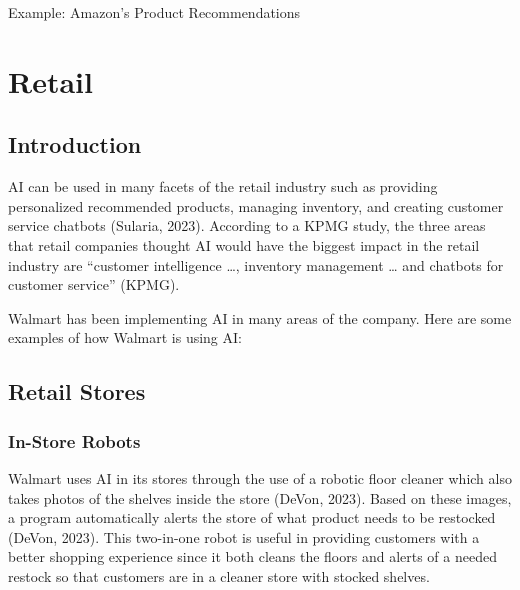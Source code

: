 \documentclass[
]{article}
\begin{document}
Example: Amazon's Product Recommendations

\hypertarget{retail}{%
\section{Retail}\label{retail}}

\hypertarget{introduction-1}{%
\subsection{Introduction}\label{introduction-1}}

AI can be used in many facets of the retail industry such as providing personalized recommended products, managing inventory, and creating customer service chatbots (Sularia, 2023). According to a KPMG study, the three areas that retail companies thought AI would have the biggest impact in the retail industry are ``customer intelligence \ldots, inventory management \ldots{} and chatbots for customer service'' (KPMG).

Walmart has been implementing AI in many areas of the company. Here are some examples of how Walmart is using AI:

\hypertarget{retail-stores}{%
\subsection{Retail Stores}\label{retail-stores}}

\hypertarget{in-store-robots}{%
\subsubsection{In-Store Robots}\label{in-store-robots}}

Walmart uses AI in its stores through the use of a robotic floor cleaner which also takes photos of the shelves inside the store (DeVon, 2023). Based on these images, a program automatically alerts the store of what product needs to be restocked (DeVon, 2023). This two-in-one robot is useful in providing customers with a better shopping experience since it both cleans the floors and alerts of a needed restock so that customers are in a cleaner store with stocked shelves.
\end{document}
